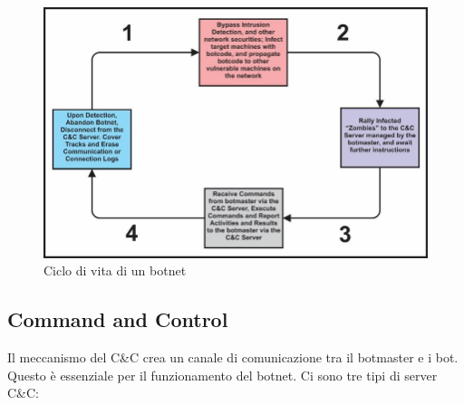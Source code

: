 \documentclass[12pt,a4paper,openright,twoside]{book}
\begin{document}
\begin{figure}
    \centering
    \includegraphics[width=.8\linewidth]{figures/The-Lifecycle-Schema-of-a-typical-Botnet.png}
    \caption{Ciclo di vita di un botnet \cite{Ogu2016}}
    \label{fig:botnet}
\end{figure}

\subsection{Command and Control} 

Il meccanismo del \acrshort{C&C} crea un canale di comunicazione
tra il botmaster e i bot. Questo è essenziale per il funzionamento
del botnet. Ci sono tre tipi di server \acrshort{C&C}:
\end{document}

